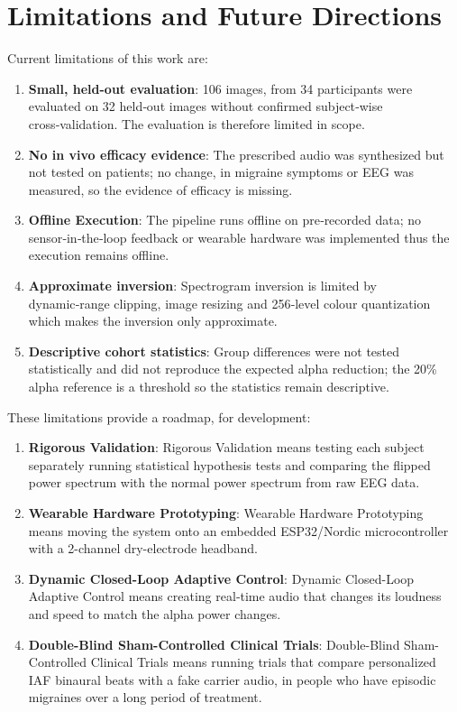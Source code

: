 \documentclass[12pt, a4paper]{report}
\begin{document}
\section{Limitations and Future Directions}
\label{sec:future_directions}
Current limitations of this work are:
\begin{enumerate}
    \item \textbf{Small, held-out evaluation}: 106 images, from 34 participants were evaluated on 32 held‑out images without confirmed subject‑wise cross‑validation. The evaluation is therefore limited in scope.
    \item \textbf{No in vivo efficacy evidence}: The prescribed audio was synthesized but not tested on patients; no change, in migraine symptoms or EEG was measured, so the evidence of efficacy is missing.
    \item \textbf{Offline Execution}: The pipeline runs offline on pre‑recorded data; no sensor‑in‑the‑loop feedback or wearable hardware was implemented thus the execution remains offline.
    \item \textbf{Approximate inversion}: Spectrogram inversion is limited by dynamic‑range clipping, image resizing and 256‑level colour quantization which makes the inversion only approximate.
    \item \textbf{Descriptive cohort statistics}: Group differences were not tested statistically and did not reproduce the expected alpha reduction; the 20\% alpha reference is a threshold so the statistics remain descriptive.
\end{enumerate}
These limitations provide a roadmap, for development:
\begin{enumerate}
    \item \textbf{Rigorous Validation}: Rigorous Validation means testing each subject separately running statistical hypothesis tests and comparing the flipped power spectrum with the normal power spectrum from raw EEG data.
    \item \textbf{Wearable Hardware Prototyping}: Wearable Hardware Prototyping means moving the system onto an embedded ESP32/Nordic microcontroller with a 2-channel dry-electrode headband.
    \item \textbf{Dynamic Closed-Loop Adaptive Control}: Dynamic Closed-Loop Adaptive Control means creating real‑time audio that changes its loudness and speed to match the alpha power changes.
    \item \textbf{Double-Blind Sham-Controlled Clinical Trials}: Double-Blind Sham-Controlled Clinical Trials means running trials that compare personalized IAF binaural beats with a fake carrier audio, in people who have episodic migraines over a long period of treatment.
\end{enumerate}
\end{document}
